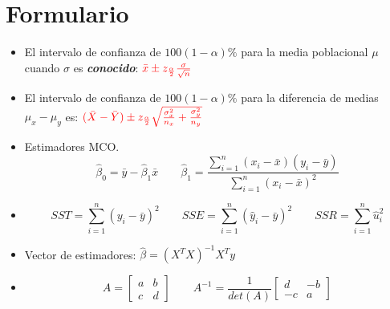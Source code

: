 \documentclass[10pt,a4paper]{article}
\begin{document}
\section*{Formulario}


\begin{itemize}

\item El intervalo de confianza de $100(1-\alpha)\%$ para la media poblacional $\mu$ cuando $\sigma$ es \emph{\textbf{conocido}}:
$\color{red}{\bar{x} \pm z_{\frac{\alpha}{2}}\frac{\sigma}{\sqrt{n}}}$

\item El intervalo de confianza de $100(1-\alpha)\%$ para la diferencia de medias
$\mu_x-\mu_y$ es:
${\color{red}(\bar{X}-\bar{Y}) \pm z_{\frac{\alpha}{2}}\sqrt{\frac{\sigma_x^2}{n_x}+\frac{\sigma_y^2}{n_y}}}$

\item  Estimadores MCO.
{\color{red}
$$\hat{\beta}_0 = \bar{y} - \hat{\beta}_1 \bar{x} \quad \quad   \hat{\beta}_1 = \frac{\sum_{i=1}^{n}(x_i - \bar{x})(y_i-\bar{y})}{\sum_{i=1}^{n}(x_i - \bar{x})^2}$$}
    
\item 
	{\color{red}	\[ SST = \sum_{i=1}^{n} (y_i - \bar{y})^2 \quad \quad  SSE = \sum_{i=1}^{n} (\hat{y}_i - \bar{y})^2 \quad \quad SSR = \sum_{i=1}^{n} \hat{u}_i^2  \]}
		
		
    \item Vector de estimadores:    
{\color{red}    $\hat{\beta}=(X^TX)^{-1}X^Ty$}

\item {\color{red}\[
A = \begin{bmatrix}
a & b \\
c & d
\end{bmatrix}
\qquad
A^{-1} = \frac{1}{det(A)} \begin{bmatrix}
d & -b \\
-c & a
\end{bmatrix}
\]}
\end{itemize}
\end{document}
